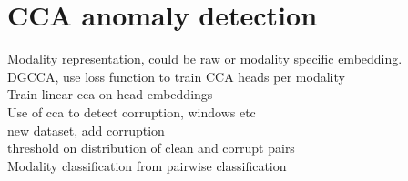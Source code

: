 \chapter{CCA anomaly detection}

Modality representation, could be raw or modality specific embedding.\\

DGCCA, use loss function to train CCA heads per modality\\

Train linear cca on head embeddings\\

Use of cca to detect corruption, windows etc\\

new dataset, add corruption\\

threshold on distribution of clean and corrupt pairs\\

Modality classification from pairwise classification\\